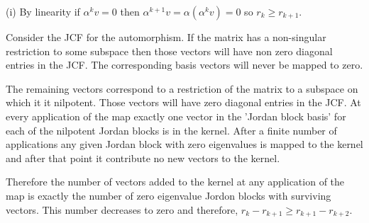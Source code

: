 \begin{solution}[\bf Solution.]
\ben
\item [(i)] By linearity if $\alpha^k v =0$ then $\alpha^{k+1}v = \alpha (\alpha^k v) = 0$ so $r_k \geq r_{k+1}$.

Consider the JCF for the automorphism. If the matrix has a non-singular restriction to some subspace then those vectors will have non zero diagonal entries in the JCF. The corresponding basis vectors will never be mapped to zero.

The remaining vectors correspond to a restriction of the matrix to a subspace on which it it nilpotent. Those vectors will have zero diagonal entries in the JCF. At every application of the map exactly one vector in the 'Jordan block basis' for each of the nilpotent Jordan blocks is in the kernel. After a finite number of applications any given Jordan block with zero eigenvalues is mapped to the kernel and after that point it contribute no new vectors to the kernel. 

Therefore the number of vectors added to the kernel at any application of the map is exactly the number of zero eigenvalue Jordon blocks with surviving vectors. This number decreases to zero and therefore, $r_k - r_{k+1} \geq r_{k+1} - r_{k+2}$.


\end{solution}
